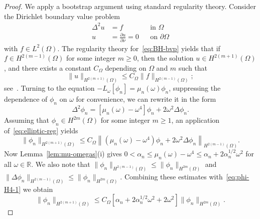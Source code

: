 \documentclass[a4paper, reqno]{amsart}
\numberwithin{equation}{section}
\theoremstyle{plain}
\theoremstyle{definition}
\theoremstyle{remark}
\newcommand{\RR}{\mathbb{R}}
\begin{document}
\begin{proof}
  We apply a bootstrap argument using standard regularity theory. Consider the Dirichlet boundary value problem
  \begin{equation}
    \label{eq:BH-bvp}
    \begin{aligned}
      \Delta^2 u & = f                                   &  & \text{in } \Omega \\
      u          & = \frac{\partial u}{\partial \nu} = 0 &  & \text{on }
      \partial\Omega
    \end{aligned}
  \end{equation}
  with $f \in L^2(\Omega)$.  The regularity theory for~\eqref{eq:BH-bvp} yields that if $f \in H^{2(m-1)}(\Omega)$ for some integer $m \ge 0$, then the solution $u \in H^{2(m+1)}(\Omega)$, and there exists a constant $C_\Omega$ depending on $\Omega$ and $m$ such that
  \begin{equation}
    \label{eq:elliptic-reg}
    \|u\|_{H^{2(m+1)}(\Omega)} \leq C_\Omega \|f\|_{H^{2(m-1)}(\Omega)};
  \end{equation}
  see~\cite[Corollary 2.21]{GGS}. Turning to the equation $-L_\omega[\phi_n] = \mu_n(\omega) \phi_n$, suppressing the dependence of $\phi_n$ on $\omega$ for convenience, we can rewrite it in the form
  \begin{equation}
    \label{eq:BH-bvp-rearranged}
    \Delta^2 \phi_n
    = [\mu_n(\omega) - \omega^4] \phi_n + 2 \omega^2 \Delta \phi_n.
  \end{equation}
  Assuming that $\phi_n\in H^{2m}(\Omega)$ for some integer $m\geq 1$, an application of~\eqref{eq:elliptic-reg} yields
  \begin{equation}
    \label{eq:phi-H4-1}
    \| \phi_n \|_{H^{2(m+1)}(\Omega)}
    \leq C_\Omega \left\|(\mu_n(\omega) - \omega^4) \phi_n + 2 \omega^2 \Delta \phi_n \right\|_{H^{2(m-1)}(\Omega)}.
  \end{equation}
  Now Lemma~\ref{lem:mu-omegas}(i) gives $0<\alpha_n\leq \mu_n(\omega) - \omega^4 \leq \alpha_n +2 \alpha_n^{1/2} \omega^2$ for all $\omega \in \RR$. We also note that $\|\phi_n\|_{H^{2(m-1)}(\Omega)}\leq \| \phi_n \|_{H^{2m}(\Omega)}$ and $\|\Delta\phi_n\|_{H^{2(m-1)}(\Omega)}\leq \| \phi_n \|_{H^{2m}(\Omega)}$. Combining these estimates with~\eqref{eq:phi-H4-1} we obtain
  \begin{equation}
    \label{eq:phi-H4-2}
    \| \phi_n \|_{H^{2(m+1)}(\Omega)}
    \leq C_\Omega \left[ \alpha_n + 2\alpha_n^{1/2}\omega^2 + 2\omega^2\right]\| \phi_n \|_{H^{2m}(\Omega)}.
  \end{equation}

\end{proof}
\end{document}
